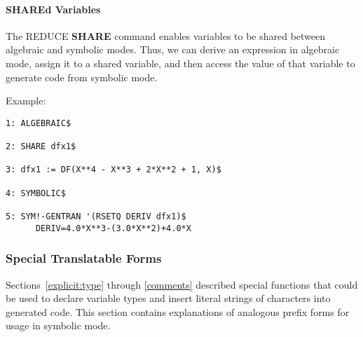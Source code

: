 \paragraph{SHAREd Variables}
\label{share} 
The REDUCE {\bf SHARE} command enables variables to be shared
between algebraic and symbolic modes.  Thus, we can derive an expression in
algebraic mode, assign it to a shared variable, and then access the value
of that variable to generate code from symbolic mode.

\begin{describe}{Example:}
\begin{verbatim}
1: ALGEBRAIC$

2: SHARE dfx1$

3: dfx1 := DF(X**4 - X**3 + 2*X**2 + 1, X)$

4: SYMBOLIC$

5: SYM!-GENTRAN '(RSETQ DERIV dfx1)$
      DERIV=4.0*X**3-(3.0*X**2)+4.0*X
\end{verbatim}
\end{describe}

\subsubsection{Special Translatable Forms}
\label{special}
Sections~\ref{explicit:type} through \ref{comments} described special
functions that could be used to declare variable types and insert
literal strings of characters into generated code.  This section
contains explanations of analogous prefix forms for usage in symbolic
mode.

